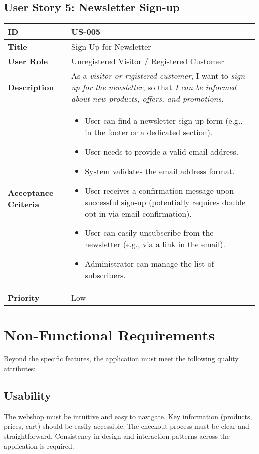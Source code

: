 \documentclass[a4paper,11pt]{article}
\begin{document}
\subsection{User Story 5: Newsletter Sign-up}
\begin{tabularx}{\textwidth}{|l|X|}
\hline
\textbf{ID} & US-005 \\
\hline
\textbf{Title} & Sign Up for Newsletter \\
\hline
\textbf{User Role} & Unregistered Visitor / Registered Customer \\
\hline
\textbf{Description} & As a \textit{visitor or registered customer}, I want to \textit{sign up for the newsletter}, so that \textit{I can be informed about new products, offers, and promotions}. \\
\hline
\textbf{Acceptance Criteria} &
\begin{itemize}[noitemsep, topsep=0pt]
    \item User can find a newsletter sign-up form (e.g., in the footer or a dedicated section).
    \item User needs to provide a valid email address.
    \item System validates the email address format.
    \item User receives a confirmation message upon successful sign-up (potentially requires double opt-in via email confirmation).
    \item User can easily unsubscribe from the newsletter (e.g., via a link in the email).
    \item Administrator can manage the list of subscribers.
\end{itemize} \\
\hline
\textbf{Priority} & Low \\
\hline
\end{tabularx}


\section{Non-Functional Requirements}
Beyond the specific features, the application must meet the following quality attributes:

\subsection{Usability}
The webshop must be intuitive and easy to navigate. Key information (products, prices, cart) should be easily accessible. The checkout process must be clear and straightforward. Consistency in design and interaction patterns across the application is required.
\end{document}
